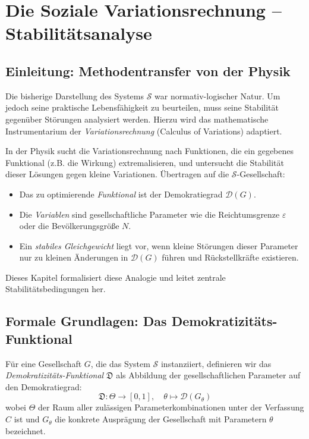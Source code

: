 
\chapter{Die Soziale Variationsrechnung -- Stabilitätsanalyse}
\label{chap:variation}

\section{Einleitung: Methodentransfer von der Physik}
Die bisherige Darstellung des Systems $\mathcal{S}$ war normativ-logischer Natur. Um jedoch seine praktische Lebensfähigkeit zu beurteilen, muss seine Stabilität gegenüber Störungen analysiert werden. Hierzu wird das mathematische Instrumentarium der \emph{Variationsrechnung} (Calculus of Variations) adaptiert.

In der Physik sucht die Variationsrechnung nach Funktionen, die ein gegebenes Funktional (z.B. die Wirkung) extremalisieren, und untersucht die Stabilität dieser Lösungen gegen kleine Variationen. Übertragen auf die $\mathcal{S}$-Gesellschaft:
\begin{itemize}
    \item Das zu optimierende \emph{Funktional} ist der Demokratiegrad $\mathcal{D}(G)$.
    \item Die \emph{Variablen} sind gesellschaftliche Parameter wie die Reichtumsgrenze $\varepsilon$ oder die Bevölkerungsgröße $N$.
    \item Ein \emph{stabiles Gleichgewicht} liegt vor, wenn kleine Störungen dieser Parameter nur zu kleinen Änderungen in $\mathcal{D}(G)$ führen und Rückstellkräfte existieren.
\end{itemize}
Dieses Kapitel formalisiert diese Analogie und leitet zentrale Stabilitätsbedingungen her.

\section{Formale Grundlagen: Das Demokratizitäts-Funktional}

\begin{definition}
    Für eine Gesellschaft $G$, die das System $\mathcal{S}$ instanziiert, definieren wir das \emph{Demokratizitäts-Funktional} $\mathfrak{D}$ als Abbildung der gesellschaftlichen Parameter auf den Demokratiegrad:
    \[
    \mathfrak{D}: \Theta \rightarrow [0,1], \quad \theta \mapsto \mathcal{D}(G_\theta)
    \]
    wobei $\Theta$ der Raum aller zulässigen Parameterkombinationen unter der Verfassung $C$ ist und $G_\theta$ die konkrete Ausprägung der Gesellschaft mit Parametern $\theta$ bezeichnet.
\end{definition}

